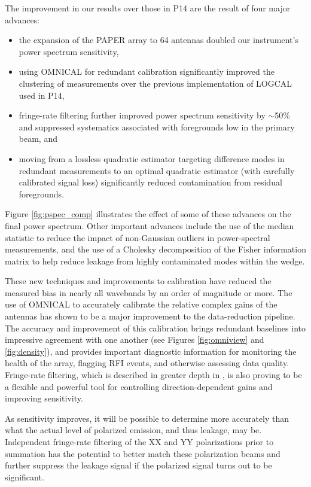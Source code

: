 \documentclass[twocolumn,numberedappendix]{emulateapj} \shorttitle{New Limits on the 21 cm Power Spectrum at $z=8.4$}
\begin{document}
The improvement in our results over those in P14 are the result of four
major advances:
\begin{itemize}
\item the expansion of the PAPER array to 64 antennas doubled our instrument's power spectrum sensitivity,
\item using OMNICAL for redundant calibration significantly improved the clustering of measurements
over the previous implementation of LOGCAL used in P14,
\item fringe-rate filtering further improved power spectrum sensitivity by $\sim$50\% and suppressed
systematics associated with foregrounds low in the primary beam, and
\item moving from a lossless quadratic estimator targeting difference modes
in redundant measurements to an optimal quadratic estimator (with carefully calibrated signal
loss) significantly reduced contamination from residual foregrounds.
\end{itemize}
Figure \ref{fig:pspec_comp} illustrates the effect of some of these advances on the final
power spectrum.
Other important advances include the use of the median statistic to reduce the impact
of non-Gaussian outliers in power-spectral measurements, and the use of a Cholesky
decomposition of the Fisher information matrix to help reduce leakage 
from highly contaminated modes within the wedge.

These new techniques and improvements to calibration have reduced the measured
bias in nearly all wavebands by an order of magnitude or more. 
The use of
OMNICAL to accurately calibrate the relative complex gains of the antennas has
shown to be a major improvement to the data-reduction pipeline. The accuracy and improvement of
this calibration brings redundant baselines into impressive agreement with one another
(see Figures \ref{fig:omniview} and \ref{fig:density}),
and provides important diagnostic information for
monitoring the health of the
array, flagging RFI events, and otherwise assessing data quality.
Fringe-rate filtering, which is described in greater depth in \citep{parsons_et_al2015}, is also
proving to be a flexible and powerful tool for controlling direction-dependent gains and
improving sensitivity. 

As sensitivity improves, it will be possible to determine more accurately than
\citet{moore_et_al2015} what the actual level of polarized emission, and thus
leakage, may be.  Independent fringe-rate filtering of the XX and YY
polarizations prior to summation has the potential to better match these
polarization beams and further suppress the leakage signal if the polarized signal
turns out to be significant.
\end{document}
